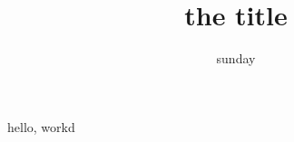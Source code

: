 \documentclass{article}
\author{sunday}
\title{the title}
\begin{document}
\maketitle
hello, workd %
\end{document}

